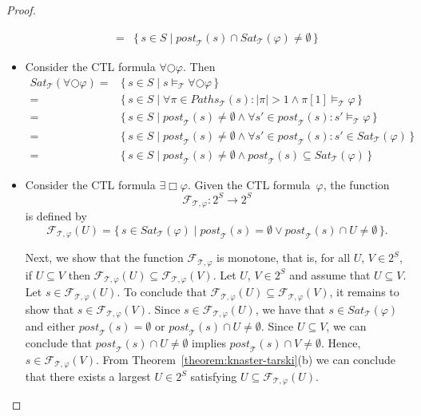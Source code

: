 \documentclass[12pt]{article}
\newcommand{\always}{\Box}
\newcommand{\nxt}{\bigcirc}
\theoremstyle{definition}
\begin{document}
\begin{proof}
\begin{itemize}
\begin{align*}
= & \{\, s \in S \mid \mathit{post}_{\mathcal{T}}(s) \cap \mathit{Sat}_{\mathcal{T}}(\varphi) \not= \emptyset \,\}
\end{align*}
\item
Consider the CTL formula $\forall \nxt \varphi$.  Then
\begin{align*}
\mathit{Sat}_{\mathcal{T}}(\forall \nxt \varphi)
= & \{\, s \in S \mid s \models_{\mathcal{T}} \forall \nxt \varphi \,\}\\
= & \{\, s \in S \mid \forall \pi \in \mathit{Paths}_{\mathcal{T}}(s) : |\pi| > 1 \wedge \pi[1] \models_{\mathcal{T}} \varphi \,\}\\
= & \{\, s \in S \mid \mathit{post}_{\mathcal{T}}(s) \not= \emptyset \wedge \forall s' \in \mathit{post}_{\mathcal{T}}(s) : s' \models_{\mathcal{T}} \varphi \,\}\\
= & \{\, s \in S \mid \mathit{post}_{\mathcal{T}}(s) \not= \emptyset \wedge \forall s' \in \mathit{post}_{\mathcal{T}}(s) : s' \in \mathit{Sat}_{\mathcal{T}}(\varphi) \,\}\\
= & \{\, s \in S \mid \mathit{post}_{\mathcal{T}}(s) \not= \emptyset \wedge \mathit{post}_{\mathcal{T}}(s) \subseteq \mathit{Sat}_{\mathcal{T}}(\varphi) \,\}
\end{align*}
\item
Consider the CTL formula $\exists \always \varphi$.  Given the CTL formula~$\varphi$, the function
\[
\mathcal{F}_{\mathcal{T}, \varphi} : 2^S \to 2^S
\]
is defined by
\[
\mathcal{F}_{\mathcal{T}, \varphi}(U) = \{\, s \in \mathit{Sat}_{\mathcal{T}}(\varphi) \mid \mathit{post}_{\mathcal{T}}(s) = \emptyset \vee \mathit{post}_{\mathcal{T}}(s) \cap U \not= \emptyset \,\}.
\]

Next, we show that the function $\mathcal{F}_{\mathcal{T}, \varphi}$ is monotone, that is, for all $U$, $V \in 2^S$, if $U \subseteq V$ then $\mathcal{F}_{\mathcal{T}, \varphi}(U) \subseteq \mathcal{F}_{\mathcal{T}, \varphi}(V)$.  Let $U$, $V \in 2^S$ and assume that $U \subseteq V$.  Let $s \in \mathcal{F}_{\mathcal{T}, \varphi}(U)$. To conclude that $\mathcal{F}_{\mathcal{T}, \varphi}(U) \subseteq \mathcal{F}_{\mathcal{T}, \varphi}(V)$, it remains to show that $s \in \mathcal{F}_{\mathcal{T}, \varphi}(V)$.  Since $s \in \mathcal{F}_{\mathcal{T}, \varphi}(U)$, we have that $s \in \mathit{Sat}_{\mathcal{T}}(\varphi)$ and either $\mathit{post}_{\mathcal{T}}(s) = \emptyset$ or $\mathit{post}_{\mathcal{T}}(s) \cap U \not= \emptyset$.  Since $U \subseteq V$, we can conclude that $\mathit{post}_{\mathcal{T}}(s) \cap U \not= \emptyset$ implies $\mathit{post}_{\mathcal{T}}(s) \cap V \not= \emptyset$.  Hence, $s \in \mathcal{F}_{\mathcal{T}, \varphi}(V)$.  From Theorem~\ref{theorem:knaster-tarski}(b) we can conclude that there exists a largest $U \in 2^S$ satisfying $U \subseteq \mathcal{F}_{\mathcal{T}, \varphi}(U)$.


\end{itemize}
\end{proof}
\end{document}
